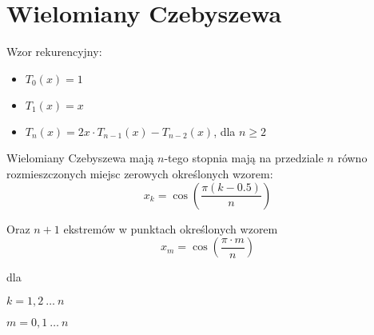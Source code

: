 \section*{Wielomiany Czebyszewa}
Wzor rekurencyjny:

\begin{itemize}
    \item $T_0(x) = 1$
    \item $T_1(x) = x$
    \item $T_n(x) = 2x\cdot T_{n-1}(x)-T_{n-2}(x)$, dla $n \ge 2$
\end{itemize}

Wielomiany Czebyszewa mają $n$-tego stopnia mają na przedziale $n$
równo rozmieszczonych miejsc zerowych określonych wzorem:
\begin{equation*}
    x_k = \cos{\left(\frac{\pi\left(k-0.5\right)}{n}\right)}
\end{equation*}

Oraz $n + 1$ ekstremów w punktach określonych wzorem
\begin{equation*}
    x_m = \cos{\left(\frac{\pi\cdot m}{n}\right)}
\end{equation*}

dla

$k = 1, 2\ \hdots\ n$

$m = 0, 1\ \hdots\ n$